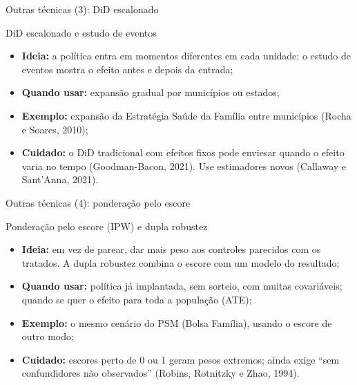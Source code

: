\begin{frame}{Outras técnicas (3): DiD escalonado}
  \begin{block}{DiD escalonado e estudo de eventos}
    \small
    \begin{itemize}\setlength{\itemsep}{2pt}
      \item \textbf{Ideia:} a política entra em momentos diferentes em cada unidade; o estudo de eventos mostra o efeito antes e depois da entrada;
      \item \textbf{Quando usar:} expansão gradual por municípios ou estados;
      \item \textbf{Exemplo:} expansão da Estratégia Saúde da Família entre municípios (Rocha e Soares, 2010);
      \item \textbf{Cuidado:} o DiD tradicional com efeitos fixos pode enviesar quando o efeito varia no tempo (Goodman-Bacon, 2021). Use estimadores novos (Callaway e Sant'Anna, 2021).
    \end{itemize}
  \end{block}
\end{frame}

\begin{frame}{Outras técnicas (4): ponderação pelo escore}
  \begin{block}{Ponderação pelo escore (IPW) e dupla robustez}
    \small
    \begin{itemize}\setlength{\itemsep}{2pt}
      \item \textbf{Ideia:} em vez de parear, dar mais peso aos controles parecidos com os tratados. A dupla robustez combina o escore com um modelo do resultado;
      \item \textbf{Quando usar:} política já implantada, sem sorteio, com muitas covariáveis; quando se quer o efeito para toda a população (ATE);
      \item \textbf{Exemplo:} o mesmo cenário do PSM (Bolsa Família), usando o escore de outro modo;
      \item \textbf{Cuidado:} escores perto de 0 ou 1 geram pesos extremos; ainda exige ``sem confundidores não observados'' (Robins, Rotnitzky e Zhao, 1994).
    \end{itemize}
  \end{block}
\end{frame}

